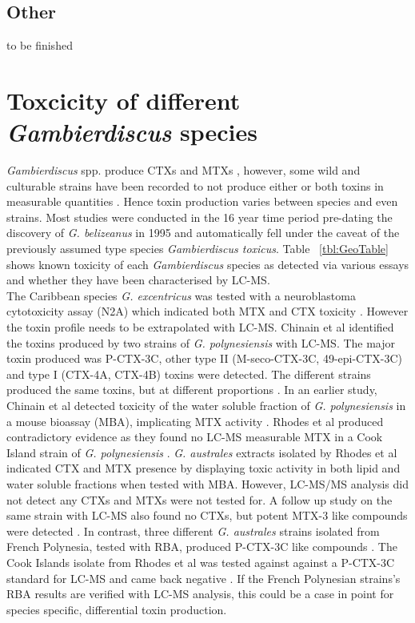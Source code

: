 \documentclass[12pt]{article}
\begin{document}
\subsection{Other}
to be finished

\section{Toxcicity of different \emph{Gambierdiscus} species}
\emph{Gambierdiscus} spp. produce CTXs and MTXs \cite{murata1990structures,holmes1991strain,satake1993structure,holmes1994purification,satake1996isolation}, however, some wild and culturable strains have been recorded to not produce either or both toxins in measurable quantities \cite{gillespie1985significance,holmes1990toxicity}. Hence toxin production varies between species and even strains. Most studies were conducted in the 16 year time period pre-dating the discovery of \emph{G. belizeanus} in 1995 \cite{faust1995observation} and automatically fell under the caveat of the previously assumed type species \emph{Gambierdiscus toxicus}. Table ~\ref{tbl:GeoTable} shows known toxicity of each \emph{Gambierdiscus} species as detected via various essays and whether they have been characterised by LC-MS. \\
The Caribbean species \emph{G. excentricus} was tested with a neuroblastoma cytotoxicity assay (N2A) which indicated both MTX and CTX toxicity \cite{fraga2011gambierdiscus}. However the toxin profile needs to be extrapolated with LC-MS.
Chinain et al identified the toxins produced by two strains of \emph{G. polynesiensis} with LC-MS. The major toxin produced was P-CTX-3C, other type II (M-seco-CTX-3C, 49-epi-CTX-3C) and type I (CTX-4A, CTX-4B) toxins were detected. The different strains produced the same toxins, but at different proportions \cite{chinain2010growth}. In an earlier study, Chinain et al detected toxicity of the water soluble fraction of \emph{G. polynesiensis} in a mouse bioassay (MBA), implicating MTX activity \cite{chinain1999morphology}. Rhodes et al produced contradictory evidence as they found no LC-MS measurable MTX in a Cook Island strain of \emph{G. polynesiensis} \cite{rhodes2014production}.
\emph{G. australes} extracts isolated by Rhodes et al indicated CTX and MTX presence by displaying toxic activity in both lipid and water soluble fractions when tested with MBA. However, LC-MS/MS analysis did not detect any CTXs and MTXs were not tested for. A follow up study on the same strain with LC-MS also found no CTXs, but potent MTX-3 like compounds were detected \cite{rhodes2014production,rhodes2010toxic}. In contrast, three different \emph{G. australes} strains isolated from French Polynesia, tested with RBA, produced P-CTX-3C like compounds \cite{chinain2010growth}. The Cook Islands isolate from Rhodes et al was tested against against a P-CTX-3C standard for LC-MS and came back negative \cite{rhodes2014production}. If the French Polynesian strains's RBA results are verified with LC-MS analysis, this could be a case in point for species specific, differential toxin production. \\
\end{document}
